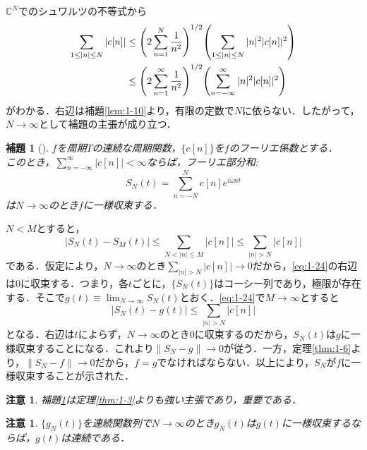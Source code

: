 \documentclass[dvipdfmx,a4j,10pt]{jsarticle}
\makeatletter
\theoremstyle{mystyle1}
\newtheorem{lemma}[definition]{補題}
\theoremstyle{mystyle3}
\theoremstyle{mystyle4}
\newtheorem{note}{注意}[section]
\theoremstyle{mystyle2}
\newtheorem{note*}{注意}
\renewenvironment{proof}[1][\proofname]{\par
  \pushQED{\qed}%
  \normalfont
  \topsep6\p@\@plus6\p@ \trivlist
  \item[\hskip\labelsep{\bfseries\sffamily #1}]\ignorespaces
}{%
  \popQED\endtrivlist\@endpefalse
}
\renewcommand\proofname{証明}
\newenvironment{lem}[1][]
{\begin{tcolorbox}[
    enhanced,
    boxrule=0pt,
    arc=0mm,
    frame hidden,
    borderline west={2pt}{-4pt}{yellow!90!black},
    breakable = true
    ]
    \begin{lemma}[#1]
}
{\end{lemma}\end{tcolorbox}}
\makeatother
\begin{document}
\begin{proof}
    $\mathbb{C}^N$でのシュワルツの不等式から
    \[
        \begin{split}
            \sum_{1\leq|n|\leq N}|c[n]|
            &\leq\mleft(2\sum_{n=1}^N\frac{1}{n^2}\mright)^{1/2}\mleft(\sum_{1\leq|n|\leq N}|n|^2|c[n]|^2\mright) \\
            &\leq\mleft(2\sum_{n=1}^\infty\frac{1}{n^2}\mright)^{1/2}\mleft(\sum_{n=-\infty}^\infty |n|^2|c[n]|^2\mright)
        \end{split}
    \]
    がわかる．右辺は補題\ref{lem:1-10}より，有限の定数で$N$に依らない．したがって，$N\to\infty$として補題の主張が成り立つ．
\end{proof}

\begin{lem}\label{lem:1-12}
    $f$を周期$T$の連続な周期関数，$\{c[n]\}$を$f$のフーリエ係数とする．\\ このとき，$\sum_{n=-\infty}^\infty |c[n]|<\infty$ならば，フーリエ部分和:
    \[
        S_N(t)=\sum_{n=-N}^N c[n]e^{i\omega nt}
    \]
    は$N\to\infty$のとき$f$に一様収束する．
\end{lem}

\begin{proof}
    $N<M$とすると，
    \begin{equation}\label{eq:1-24}
        |S_N(t)-S_M(t)|\leq\sum_{N<|n|\leq M}|c[n]|\leq\sum_{|n|>N}|c[n]|
    \end{equation}
    である．仮定により，$N\to\infty$のとき$\sum_{|n|>N}|c[n]|\to 0$だから，\eqref{eq:1-24}の右辺は$0$に収束する．つまり，各$t$ごとに，$\{S_N(t)\}$はコーシー列であり，極限が存在する．そこで$g(t)\equiv\lim_{N\to\infty}S_N(t)$とおく．\eqref{eq:1-24}で$M\to\infty$とすると
    \[
        |S_N(t)-g(t)|\leq\sum_{|n|>N}|c[n]|
    \]
    となる．右辺は$t$によらず，$N\to\infty$のとき$0$に収束するのだから，$S_N(t)$は$g$に一様収束することになる．これより$\|S_N-g\|\to 0$が従う．一方，定理\ref{thm:1-6}より，$\|S_N-f\|\to 0$だから，$f=g$でなければならない．以上により，$S_N$が$f$に一様収束することが示された．
\end{proof}

\begin{note*}
    補題\ref{lem:1-12}は定理\ref{thm:1-3}よりも強い主張であり，重要である．
\end{note*}

\begin{note}
    $\{g_N(t)\}$を連続関数列で$N\to\infty$のとき$g_N(t)$は$g(t)$に一様収束するならば，$g(t)$は連続である．
\end{note}
\end{document}
